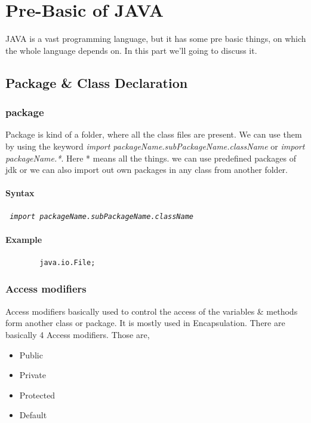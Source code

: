 \documentclass[openany]{book}  %
\begin{document}
% 
% 
\part{Pre-Basic of JAVA}

JAVA is a vast programming language, but it has some pre basic things, on which the whole language depends on. In this part we'll going to discuss it.

% 
% 
\chapter{Package \& Class Declaration}

% 
% 
\section{package}
Package is kind of a folder, where all the class files are present. We can use them by using the keyword \textit{import packageName.subPackageName.className} or
\textit{import packageName.*}. Here * means all the things. we can use predefined packages of jdk or we can also import out own packages in any class from another folder.
% 
% 
\subsection{Syntax}
\begin{center}
    \tt{
        \textit{import packageName.subPackageName.className}
    }
\end{center}
% 
% 
\subsection{Example}
\begin{center}
    \begin{verbatim}
        java.io.File;
    \end{verbatim}
\end{center}

% 
% 
\section{Access modifiers}
Access modifiers basically used to control the access of the variables \& methods form another class or package. It is mostly used in Encapsulation.
There are basically 4 Access modifiers. Those are,
\begin{itemize}
    \item Public
    \item Private
    \item Protected
    \item Default
\end{itemize}
% 
%
\end{document}
